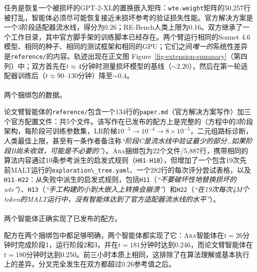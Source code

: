 \documentclass[
]{article}
\makeatletter
\let\oldparagraph\paragraph
\renewcommand{\paragraph}{
    \@ifstar
      \xxxParagraphStar
      \xxxParagraphNoStar
  }
\newcommand{\xxxParagraphStar}[1]{\oldparagraph*{#1}\mbox{}}
\newcommand{\xxxParagraphNoStar}[1]{\oldparagraph{#1}\mbox{}}
\newcommand{\passthrough}[1]{#1}
\theoremstyle{definition}
\newcommand{\ara}{\textsc{Ara}}
\makeatother
\begin{document}
任务是恢复一个被损坏的GPT-2-XL的置换嵌入矩阵：\passthrough{\lstinline!wte.weight!}矩阵的50,257行被打乱，智能体必须尽可能恢复接近未损坏参考的验证损失性能。官方解决方案是一个3阶段适配器流水线，得分为0.26；RE-Bench人类上限为0.16。双方继承了一个工作目录，其中官方脚手架的训练脚本已经存在。两个臂运行相同的Sonnet
4.6模型、相同的种子、相同的测试框架和相同的GPU；它们之间\emph{唯一的}系统性差异是\passthrough{\lstinline!reference/!}的内容。轨迹出现在正文图
Figure~\ref{fig-extension-summary}（第四列）中；双方首先在\(t \approx 4\)分钟时测量损坏模型的基线（\({\sim}2.20\)），然后在第一轮适配器训练后（\(t \approx 90\)--\(130\)分钟）降至\({\sim}0.4\)。

\paragraph{两个捆绑包的数据。}\label{ux4e24ux4e2aux6346ux7ed1ux5305ux7684ux6570ux636e}

论文臂智能体的\passthrough{\lstinline!reference/!}包含一个134行的\passthrough{\lstinline!paper.md!}（官方解决方案写作）加三个官方配置文件：共5个文件。该写作在已发布的配方上是完整的（方程中的3阶段架构，每阶段可训练参数集，LR阶梯\(10^{-3} \to 10^{-4} \to 8\times 10^{-5}\)，二元组路标诊断，人类最佳上限，甚至有一条作者备注称\emph{``阶段C是流水线中验证最少的部分\ldots 如果阶段B尚未收敛，可能是不必要的''}）。\ara{}捆绑包为22个文件/5,887行，携带相同的算法内容通过10条参考派生的启发式规则（\passthrough{\lstinline!H01!}--\passthrough{\lstinline!H10!}），但增加了一个包含19次先前MALT运行的\passthrough{\lstinline!exploration\_tree.yaml!}、一个282行的每次评分尝试表格，以及\passthrough{\lstinline!H11!}--\passthrough{\lstinline!H22!}：从失败中派生的启发式规则，包括\passthrough{\lstinline!H11!}（\emph{``不要破坏性地替换损坏的wte''}）、\passthrough{\lstinline!H13!}（\emph{``手工构建的小到大嵌入上转换会崩溃''}）和\passthrough{\lstinline!H22!}（\emph{``在19次每次4M个token的MALT运行中，没有智能体达到了官方适配器流水线的水平''}）。

\paragraph{两个智能体正确实现了已发布的配方。}\label{ux4e24ux4e2aux667aux80fdux4f53ux6b63ux786eux5b9eux73b0ux4e86ux5df2ux53d1ux5e03ux7684ux914dux65b9}

配方在两个捆绑包中都足够明确，两个智能体都实现了它：\ara{}智能体在\(t = 26\)分钟时完成阶段1，运行阶段2和3，并在\(t = 181\)分钟时达到0.246，而论文臂智能体在\(t = 180\)分钟时达到0.250。前三小时本质上相同，这排除了在算法理解或基本执行上的差异。分叉完全发生在双方都超过0.26参考值之后。
\end{document}
